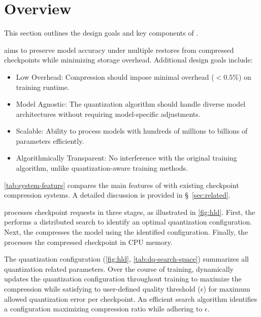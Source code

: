 \section{Overview}
\label{sec:background}

This section outlines the design goals and key components of \sys.



\sys aims to preserve model accuracy under multiple restores from compressed checkpoints while minimizing storage overhead. Additional design goals include:

\begin{itemize}
\item Low Overhead: Compression should impose minimal overhead ($<0.5$\%) on training runtime.
\item Model Agnostic: The quantization algorithm should handle diverse model architectures without requiring model-specific adjustments.
\item Scalable: Ability to process models with hundreds of millions to billions of parameters efficiently.
\item Algorithmically Transparent: No interference with the original training algorithm, unlike quantization-aware training methods.
\end{itemize}

\autoref{tab:system-featurs} compares the main features of \sys with existing checkpoint compression systems. A detailed discussion is provided in \S~\ref{sec:related}.

\sys processes checkpoint requests in three stages, as illustrated in \autoref{fig:hld}. First, the \qcm performs a distributed search to identify an optimal quantization configuration. Next, the \quantizer compresses the model using the identified configuration. Finally, the \deltaE processes the compressed checkpoint in CPU memory. 



\noindent{\textbf{\qcm} (\S~\ref{sec:search}):} 
The quantization configuration (\autoref{fig:hld}, \autoref{tab:dq-search-space}) summarizes all quantization related parameters. Over the course of training, \sys dynamically updates the quantization configuration throughout training to maximize the compression while satisfying to user-defined  quality threshold ($\epsilon$) for maximum allowed quantization error per checkpoint. An efficient search algorithm identifies a configuration maximizing compression ratio while adhering to $\epsilon$.



